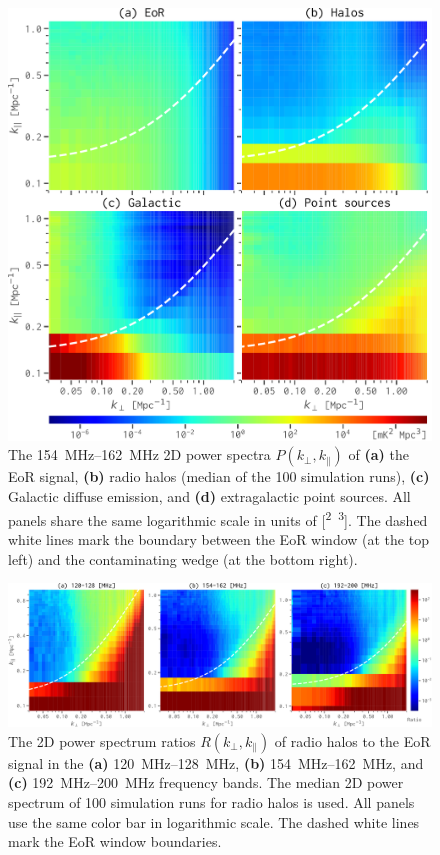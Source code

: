 \documentclass[twocolumn]{aastex62}
\newcommand{\klos}{\text{$k_{\parallel}$}}
\newcommand{\kperp}{\text{$k_{\bot}$}}
\begin{document}
\begin{figure}
  \centering
  \includegraphics[width=\columnwidth]{ps2d-band158}
  \caption{\label{fig:ps2d}%
    The \SIrange{154}{162}{\MHz} 2D power spectra $P(\kperp, \klos)$ of
    \textbf{(a)} the EoR signal,
    \textbf{(b)} radio halos (median of the 100 simulation runs),
    \textbf{(c)} Galactic diffuse emission,
    and
    \textbf{(d)} extragalactic point sources.
    All panels share the same logarithmic scale in units of
    [\si{\mK\squared\Mpc\cubed}].
    The dashed white lines mark the boundary between the EoR window
    (at the top left) and the contaminating wedge (at the bottom right).
  }
\end{figure}

\begin{figure}
  \centering
  \includegraphics[width=\textwidth]{ps2d-ratio-3bands}
  \caption{\label{fig:ps2d-ratio}%
    The 2D power spectrum ratios $R(\kperp, \klos)$ of radio halos to the
    EoR signal in the
    \textbf{(a)} \SIrange{120}{128}{\MHz},
    \textbf{(b)} \SIrange{154}{162}{\MHz}, and
    \textbf{(c)} \SIrange{192}{200}{\MHz} frequency bands.
    The median 2D power spectrum of 100 simulation runs for radio halos
    is used.
    All panels use the same color bar in logarithmic scale.
    The dashed white lines mark the EoR window boundaries.
  }
\end{figure}
\end{document}
